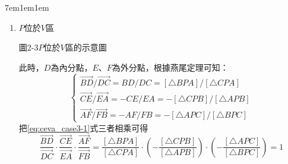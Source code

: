 \documentclass[12pt]{article}
\begin{document}
\begin{mybox}[必要性證明]{7em}{1em}{1em}
\begin{enumerate}[label=Case \arabic*：, itemsep=2em]
        \item $P$位於$V$區
        \begin{center}
            \vspace{0.5cm}
            \noindent
            \begin{minipage}{\textwidth}
            \centering
            圖2-3\quad $P$位於$V$區的示意圖
            \end{minipage}%
        \end{center}
        此時，$D$為內分點，$E$、$F$為外分點，根據燕尾定理可知：
        \begin{equation}
            \begin{cases}
                \overrightarrow{BD}/\overrightarrow{DC}=BD/DC=\left[\triangle{BPA}\right]/\left[\triangle{CPA}\right]\\
                \overrightarrow{CE}/\overrightarrow{EA}=-CE/EA=-\left[\triangle{CPB}\right]/\left[\triangle{APB}\right]\\
                \overrightarrow{AF}/\overrightarrow{FB}=-AF/FB=-\left[\triangle{APC}\right]/\left[\triangle{BPC}\right]
            \end{cases}\label{eq:ceva_case3-1}
        \end{equation}
        把\eqref{eq:ceva_case3-1}式三者相乘可得
        \begin{equation}
            \frac{\overrightarrow{BD}}{\overrightarrow{DC}}
            \cdot\frac{\overrightarrow{CE}}{\overrightarrow{EA}}
            \cdot\frac{\overrightarrow{AF}}{\overrightarrow{FB}}
            =\frac{\left[\triangle{BPA}\right]}{\left[\triangle{CPA}\right]}
            \cdot\left(-\frac{\left[\triangle{CPB}\right]}{\left[\triangle{APB}\right]}\right)
            \cdot\left(-\frac{\left[\triangle{APC}\right]}{\left[\triangle{BPC}\right]}\right)
            =1\label{eq:ceva_case3-2}
        \end{equation}
    \end{enumerate}
\end{mybox}
\end{document}
